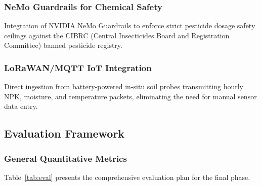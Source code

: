 \documentclass[12pt,a4paper]{article}
\begin{document}
\subsubsection{NeMo Guardrails for Chemical Safety}
Integration of NVIDIA NeMo Guardrails to enforce strict pesticide dosage safety ceilings against the CIBRC (Central Insecticides Board and Registration Committee) banned pesticide registry.

\subsubsection{LoRaWAN/MQTT IoT Integration}
Direct ingestion from battery-powered in-situ soil probes transmitting hourly NPK, moisture, and temperature packets, eliminating the need for manual sensor data entry.

\subsection{Evaluation Framework}

\subsubsection{General Quantitative Metrics}

Table~\ref{tab:eval} presents the comprehensive evaluation plan for the final phase.
\end{document}
